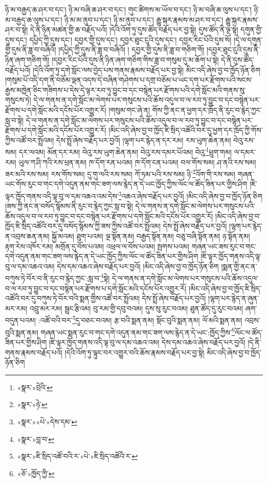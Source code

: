 ཉི་མ་བརྒྱད་ཆ་ཤར་བ་དང་། ཉི་མ་བཞི་ཆ་ཤར་བ་དང་། གུང་ཚིགས་མ་ཡོལ་བ་དང་། ཉི་མ་བཞི་ཆ་ལུས་པ་དང་། ཉི་མ་བརྒྱད་ཆ་ལུས་པ་དང་། ཉི་མ་མ་ནུབ་པ་དང་། ཉི་མ་ནུབ་པ་དང་། རྒྱུ་སྐར་རྣམས་མ་ཤར་བ་དང་། རྒྱུ་སྐར་རྣམས་ཤར་བ་སྟེ། དེ་ནི་ཉིན་མཚན་གྱི་ཆ་བརྗོད་པའོ། །དེའི་འོག་ཏུ་དུས་ཚོད་བརྗོད་པར་བྱ་སྟེ། དུས་ཚོད་ནི་ལྔ་སྟེ། དགུན་གྱི་དུས་དང་། དཔྱིད་ཀྱི་དུས་དང་། དབྱར་གྱི་དུས་དང་། དབྱར་ཐུང་ངུའི་དུས་དང་། དབྱར་རིང་པོའི་དུས་སོ། །དེ་ལ་དགུན་གྱི་དུས་ནི་ཟླ་བ་བཞིའོ། །དཔྱིད་ཀྱི་དུས་ནི་ཟླ་བ་བཞིའོ། །
དབྱར་གྱི་དུས་ནི་ཟླ་བ་གཅིག་གོ། །དབྱར་ཐུང་ངུའི་དུས་ནི་ཉིན་ཞག་གཅིག་གོ། །དབྱར་རིང་པོའི་དུས་ནི་ཉིན་ཞག་གཅིག་གིས་ཟླ་བ་གསུམ་དུ་མ་ཆོག་པ་སྟེ། དེ་ནི་དུས་ཚོད་བརྗོད་པའོ། །དེའི་འོག་ཏུ་དགེ་སློང་ལས་བྱེད་པས་གནས་རྣམས་བརྗོད་པར་བྱ་སྟེ། མིང་འདི་ཞེས་བྱ་བ་ཁྱོད་ཉོན་ཅིག །གསུམ་པོ་འདི་དག་ནི་བཅོམ་ལྡན་འདས་དེ་བཞིན་གཤེགས་པ་དགྲ་བཅོམ་པ་ཡང་དག་པར་རྫོགས་པའི་སངས་རྒྱས་མཁྱེན་ཅིང་གཟིགས་པ་དེས་དེ་ལྟར་རབ་ཏུ་བྱུང་བ་དང་བསྙེན་པར་རྫོགས་པའི་དགེ་སློང་མའི་གནས་སུ་གསུངས་ཏེ། དེ་ལ་གནས་ན་དགེ་སློང་མ་ལེགས་པར་གསུངས་པའི་ཆོས་འདུལ་བ་ལ་རབ་ཏུ་བྱུང་བ་དང་བསྙེན་པར་རྫོགས་པ་དགེ་སློང་མའི་དངོས་པོར་འགྱུར་རོ། །གསུམ་གང་ཞེ་ན། གོས་ཀྱི་ནང་ན་ཕྱག་དར་ཁྲོད་ནི་རུང་བ་རྙེད་ཀྱང་སླ་བ་སྟེ། དེ་ལ་གནས་ན་དགེ་སློང་མ་ལེགས་པར་གསུངས་པའི་ཆོས་འདུལ་བ་ལ་རབ་ཏུ་བྱུང་བ་དང་བསྙེན་པར་རྫོགས་པ་དགེ་སློང་མའི་དངོས་པོར་འགྱུར་རོ། །མིང་འདི་ཞེས་བྱ་བ་ཁྱོད་ཇི་སྲིད་འཚོའི་བར་དུ་ཕྱག་དར་ཁྲོད་ཀྱི་གོས་ཀྱིས་འཚོ་བར་སྤྲོའམ། དེས་སྤྲོ་ཞེས་བརྗོད་པར་བྱའོ། །ལྷག་པར་རྙེད་ན་དར་རམ། རས་ཡུག་ཆེན་ནམ། བེའུ་རས་སམ། དར་ལའམ། མོན་དར་རམ། བེའུ་རས་ཡུག་ཆེན་ནམ། བེའུ་རས་དམར་པོའམ། བེའུ་\footnote{«སྣར་»བྲེའི་}ཕྲུག་གམ། ལ་དམར་རམ། ཡུལ་ཀ་ཤི་ཀའི་རས་ཕྲན་ནམ། ཁ་དོག་རན་པའམ། ཁ་དོག་ངན་པའམ། བལ་གོས་སམ། ཤ་ནའི་རས་སམ། ཟར་མའི་རས་སམ། རས་གོས་སམ། དུ་གུ་ལའི་རས་སམ། ཀོ་ཏམ་པའི་རས་སམ། ཉི་\footnote{«སྣར་»ཉེ་}འོག་གི་རས་སམ། གཞན་ཡང་གོས་རུང་བ་གང་དགེ་འདུན་ནམ་གང་ཟག་ལས་རྙེད་ན་དེ་ཡང་ཁྱོད་ཀྱིས་ལོང་ལ་ཚོད་ཟིན་པར་གྱིས་ཤིག །ཇི་ལྟར་ཁྱོད་གནས་འདི་ལྟ་བུ་ལ་དམ་འཆའ་འམ་དེས་\footnote{«སྣར་»«པེ་»དེས་དམ་}འཆའ་ཞེས་བརྗོད་པར་བྱའོ། །མིང་འདི་ཞེས་བྱ་བ་ཁྱོད་ཉོན་ཅིག །ཟས་ཀྱི་ནང་ན་བསོད་སྙོམས་ནི་རུང་བ་རྙེད་ཀྱང་སླ་བ་སྟེ། དེ་ལ་གནས་ན་དགེ་སློང་མ་ལེགས་པར་གསུངས་པའི་ཆོས་འདུལ་བ་ལ་རབ་ཏུ་བྱུང་བ་དང་བསྙེན་པར་རྫོགས་པ་དགེ་སློང་མའི་དངོས་པོར་འགྱུར་རོ། །མིང་འདི་ཞེས་བྱ་བ་ཁྱོད་ཇི་སྲིད་འཚོའི་བར་དུ་བསོད་སྙོམས་ཀྱི་ཟས་ཀྱིས་འཚོ་བར་སྤྲོའམ། དེས་སྤྲོ་ཞེས་བརྗོད་པར་བྱའོ། །ལྷག་པར་རྙེད་ན་འབྲས་ཆན་ནམ། སྐྱོ་མའམ། ཐུག་པའམ། ལྔ་སྟོན་ནམ། བརྒྱད་སྟོན་ནམ། བཅུ་བཞི་སྟོན་ནམ། ཉ་སྟོན་ནམ། རྟག་རེས་འཁོར་རམ། མགྲོན་དུ་བོས་པའམ། འཕྲལ་ལ་བོས་པའམ། སྤགས་པའམ། གཞན་ཡང་ཟས་རུང་བ་གང་དགེ་འདུན་ནམ་གང་ཟག་ལས་རྙེད་ན་དེ་ཡང་ཁྱོད་ཀྱིས་ལོང་ལ་ཚོད་ཟིན་པར་གྱིས་ཤིག །ཇི་ལྟར་ཁྱོད་གནས་འདི་ལྟ་བུ་ལ་དམ་འཆའ་འམ། དེས་དམ་འཆའ་ཞེས་བརྗོད་པར་བྱའོ། །མིང་འདི་ཞེས་བྱ་བ་ཁྱོད་ཉོན་ཅིག །སྨན་གྱི་ནང་ན་བཀུས་ཏེ་བོར་བ་ནི་རུང་བ་རྙེད་ཀྱང་:སླ་བ་\footnote{«སྣར་»བླ་བ་}སྟེ། དེ་ལ་གནས་ན་དགེ་སློང་མ་ལེགས་པར་གསུངས་པའི་ཆོས་འདུལ་བ་ལ་རབ་ཏུ་བྱུང་བ་དང་བསྙེན་པར་རྫོགས་པ་དགེ་སློང་མའི་དངོས་པོར་འགྱུར་རོ། །མིང་འདི་ཞེས་བྱ་བ་ཁྱོད་ཇི་སྲིད་འཚོའི་བར་དུ་བཀུས་ཏེ་བོར་བའི་སྨན་གྱིས་འཚོ་བར་སྤྲོའམ། དེས་སྤྲོ་ཞེས་བརྗོད་པར་བྱའོ། །ལྷག་པར་རྙེད་ན་ཞུན་མར་རམ། འབྲུ་མར་རམ། སྦྲང་རྩིའམ། བུ་རམ་གྱི་དབུ་བའམ། དུས་སུ་རུང་བའམ། ཐུན་ཚོད་དུ་རུང་བའམ། ཞག་བདུན་པའམ། :འཚོ་བའི་བར་\footnote{«སྣར་»ཇི་སྲིད་འཚོ་བའི་ར་«པེ་»ཇི་སྲིད་འཚོའི་ར་}དུ་བཅང་བའམ། རྩ་བའི་སྨན་ནམ། སྡོང་བུའི་སྨན་ནམ། ལོ་མའི་སྨན་ནམ། འབྲས་བུའི་སྨན་ནམ། གཞན་ཡང་སྨན་རུང་བ་གང་དགེ་འདུན་ནམ་གང་ཟག་ལས་རྙེད་ན་དེ་ཡང་:ཁྱོད་ཀྱིས་\footnote{«ཅོ་»ཁྱོད་ཀྱི་}ལོང་ལ་ཚོད་ཟིན་པར་གྱིས་ཤིག །ཇི་ལྟར་ཁྱོད་གནས་འདི་ལྟ་བུ་ལ་དམ་འཆའ་འམ། དེས་དམ་འཆའ་ཞེས་བརྗོད་པར་བྱའོ། །དེ་ནི་གནས་རྣམས་བརྗོད་པའོ། །དེའི་འོག་ཏུ་ལྟུང་བར་འགྱུར་བའི་ཆོས་རྣམས་བརྗོད་པར་བྱ་སྟེ། མིང་འདི་ཞེས་བྱ་བ་ཁྱོད་ཉོན་ཅིག 